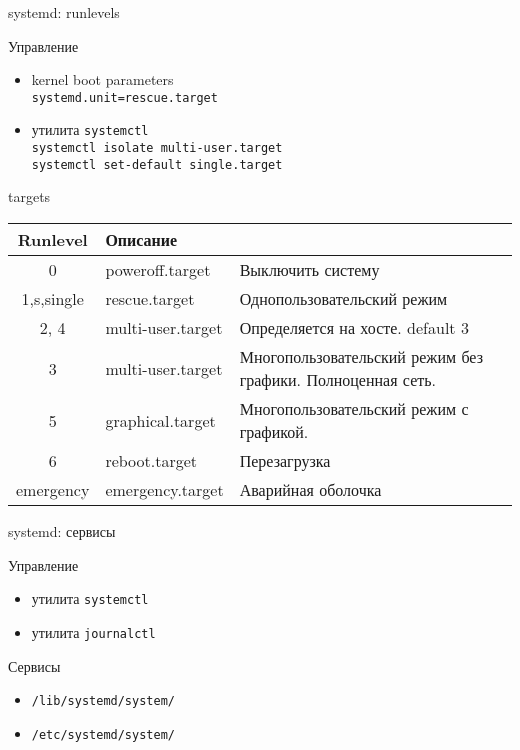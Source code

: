 \begin{frame}{systemd: runlevels}
	\begin{block}{Управление}
		\begin{itemize}
			\item kernel boot parameters\\
				{\tt systemd.unit=rescue.target} \\
			\item утилита {\tt systemctl} \\
				{\tt systemctl isolate multi-user.target} \\
				{\tt systemctl set-default single.target}
		\end{itemize}
	\end{block}

	\begin{block}{targets}
		\tiny
		\begin{table}
			\begin{tabular}{| c | l | l | }
			\hline
			Runlevel & Описание\\
			\hline
			0	& poweroff.target & Выключить систему \\
			1,s,single & rescue.target  & Однопользовательский режим \\
			2, 4	& multi-user.target & Определяется на хосте. default 3\\
			3	& multi-user.target & Многопользовательский режим без графики. Полноценная сеть. \\
			5	& graphical.target & Многопользовательский режим с графикой.\\
			6	& reboot.target & Перезагрузка\\
			emergency & emergency.target & Аварийная оболочка \\
			\hline
			\end{tabular}
		\end{table}
	\end{block}
\end{frame}

\begin{frame}{systemd: сервисы}
	\begin{block}{Управление}
		\begin{itemize}
			\item утилита {\tt systemctl}
			\item утилита {\tt journalctl}
		\end{itemize}
	\end{block}

	\begin{block}{Сервисы}
		\begin{itemize}
			\item {\tt /lib/systemd/system/}
			\item {\tt /etc/systemd/system/}
		\end{itemize}
	\end{block}
\end{frame}

